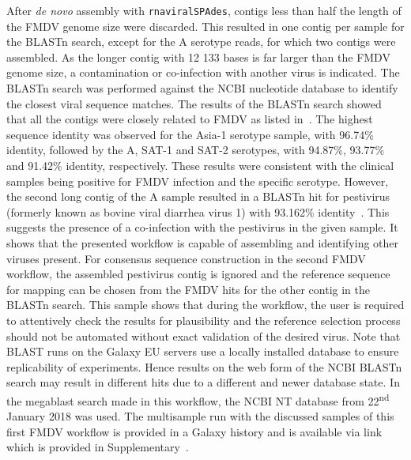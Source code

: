 After \textit{de novo} assembly with \texttt{rnaviralSPAdes}, contigs less than half the length of the \ac{FMDV} genome size were discarded. This resulted in one contig per sample for the \ac{BLAST}n search, except for the A serotype reads, for which two contigs were assembled. As the longer contig with 12 133 bases is far larger than the \ac{FMDV} genome size, a contamination or co-infection with another virus is indicated. The \ac{BLAST}n search was performed against the \ac{NCBI} nucleotide database to identify the closest viral sequence matches. The results of the \ac{BLAST}n search showed that all the contigs were closely related to \ac{FMDV} as listed in~. The highest sequence identity was observed for the Asia-1 serotype sample, with 96.74\% identity, followed by the A, SAT-1 and SAT-2 serotypes, with 94.87\%, 93.77\% and 91.42\% identity, respectively. These results were consistent with the clinical samples being positive for \ac{FMDV} infection and the specific serotype. However, the second long contig of the A sample resulted in a \ac{BLAST}n hit for pestivirus (formerly known as bovine viral diarrhea virus 1) with 93.162\% identity~\cite{smith2017proposed}. This suggests the presence of a co-infection with the pestivirus in the given sample. It shows that the presented workflow is capable of assembling and identifying other viruses present. For consensus sequence construction in the second \ac{FMDV} workflow, the assembled pestivirus contig is ignored and the reference sequence for mapping can be chosen from the \ac{FMDV} hits for the other contig in the \ac{BLAST}n search. This sample shows that during the workflow, the user is required to attentively check the results for plausibility and the reference selection process should not be automated without exact validation of the desired virus. Note that \ac{BLAST} runs on the Galaxy EU servers use a locally installed database to ensure replicability of experiments. Hence results on the web form of the \ac{NCBI} \ac{BLAST}n search may result in different hits due to a different and newer database state. In the megablast search made in this workflow, the \ac{NCBI} NT database from 22\textsuperscript{nd} January 2018 was used. The multisample run with the discussed samples of this first \ac{FMDV} workflow is provided in a Galaxy history and is available via link which is provided in Supplementary~.


